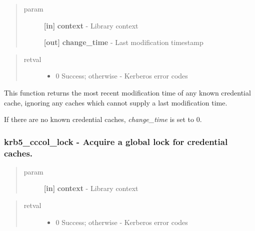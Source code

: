 \documentclass[letterpaper,10pt,english]{sphinxmanual}
\begin{document}
\begin{quote}\begin{description}
\item[{param}] \leavevmode
\textbf{{[}in{]}} \textbf{context} - Library context

\textbf{{[}out{]}} \textbf{change\_time} - Last modification timestamp

\end{description}\end{quote}
\begin{quote}\begin{description}
\item[{retval}] \leavevmode\begin{itemize}
\item {} 
0   Success; otherwise - Kerberos error codes

\end{itemize}

\end{description}\end{quote}

This function returns the most recent modification time of any known credential cache, ignoring any caches which cannot supply a last modification time.

If there are no known credential caches, \emph{change\_time} is set to 0.


\subsubsection{krb5\_cccol\_lock -  Acquire a global lock for credential caches.}
\label{appdev/refs/api/krb5_cccol_lock::doc}\label{appdev/refs/api/krb5_cccol_lock:krb5-cccol-lock-acquire-a-global-lock-for-credential-caches}

\begin{fulllineitems}
\label{appdev/refs/api/krb5_cccol_lock:krb5_cccol_lock}
\end{fulllineitems}

\begin{quote}\begin{description}
\item[{param}] \leavevmode
\textbf{{[}in{]}} \textbf{context} - Library context

\end{description}\end{quote}
\begin{quote}\begin{description}
\item[{retval}] \leavevmode\begin{itemize}
\item {} 
0   Success; otherwise - Kerberos error codes

\end{itemize}

\end{description}\end{quote}
\end{document}
